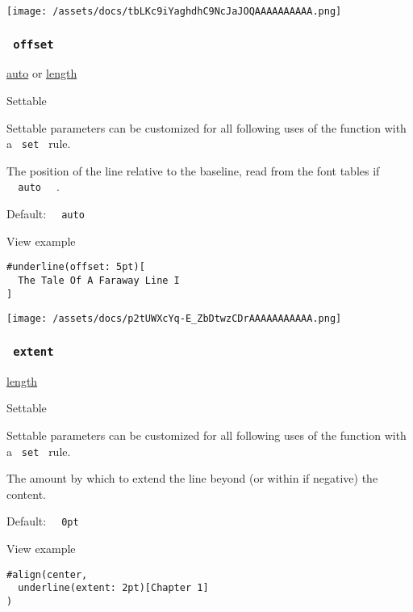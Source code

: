 \texttt{[image: /assets/docs/tbLKc9iYaghdhC9NcJaJOQAAAAAAAAAA.png]}

\subsubsection{\texorpdfstring{\texttt{\ offset\ }}{ offset }}\label{parameters-offset}

\href{/docs/reference/foundations/auto/}{auto} {or}
\href{/docs/reference/layout/length/}{length}

{{ Settable }}

\label{parameters-offset-settable-tooltip}
Settable parameters can be customized for all following uses of the
function with a \texttt{\ set\ } rule.

The position of the line relative to the baseline, read from the font
tables if \texttt{\ }{\texttt{\ auto\ }}\texttt{\ } .

Default: \texttt{\ }{\texttt{\ auto\ }}\texttt{\ }


View example

\begin{verbatim}
#underline(offset: 5pt)[
  The Tale Of A Faraway Line I
]
\end{verbatim}

\texttt{[image: /assets/docs/p2tUWXcYq-E\_ZbDtwzCDrAAAAAAAAAAA.png]}

\subsubsection{\texorpdfstring{\texttt{\ extent\ }}{ extent }}\label{parameters-extent}

\href{/docs/reference/layout/length/}{length}

{{ Settable }}

\label{parameters-extent-settable-tooltip}
Settable parameters can be customized for all following uses of the
function with a \texttt{\ set\ } rule.

The amount by which to extend the line beyond (or within if negative)
the content.

Default: \texttt{\ }{\texttt{\ 0pt\ }}\texttt{\ }


View example

\begin{verbatim}
#align(center,
  underline(extent: 2pt)[Chapter 1]
)
\end{verbatim}

